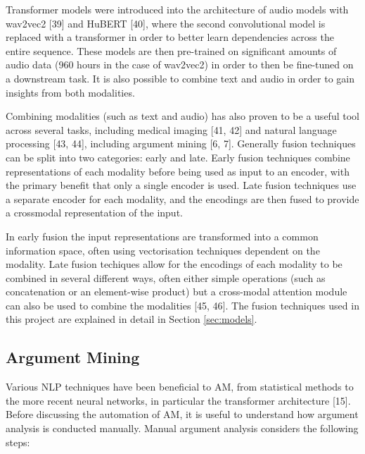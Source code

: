 \documentclass[twocolumn]{article}
\begin{document}
Transformer models were introduced into the architecture of audio models
with wav2vec2 {[}39{]} and HuBERT {[}40{]}, where the second
convolutional model is replaced with a transformer in order to better
learn dependencies across the entire sequence. These models are then
pre-trained on significant amounts of audio data (960 hours in the case
of wav2vec2) in order to then be fine-tuned on a downstream task. It is
also possible to combine text and audio in order to gain insights from
both modalities.

Combining modalities (such as text and audio) has also proven to be a
useful tool across several tasks, including medical imaging {[}41, 42{]}
and natural language processing {[}43, 44{]}, including
argument mining {[}6, 7{]}. Generally fusion techniques can be
split into two categories: early and late. Early fusion techniques
combine representations of each modality before being used as input to
an encoder, with the primary benefit that only a single encoder is used.
Late fusion techniques use a separate encoder for each modality, and the
encodings are then fused to provide a crossmodal representation of the
input.

In early fusion the input representations are transformed into a common
information space, often using vectorisation techniques dependent on the
modality. Late fusion techiques allow for the encodings of each modality
to be combined in several different ways, often either simple operations
(such as concatenation or an element-wise product) but a cross-modal
attention module can also be used to combine the modalities {[}45, 46{]}.
The fusion techniques used in this project are explained in
detail in Section \ref{sec:models}.

\subsection{Argument Mining}\label{argument-mining}

Various NLP techniques have been beneficial to AM, from statistical
methods to the more recent neural networks, in particular the
transformer architecture {[}15{]}. Before discussing the automation of
AM, it is useful to understand how argument analysis is conducted
manually. Manual argument analysis considers the following steps:
\end{document}
